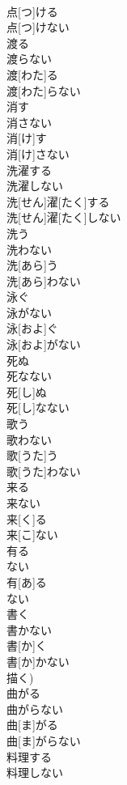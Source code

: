 \documentclass[8pt]{extreport}
\begin{document}
\begin{CJK}{UTF8}{min}
\\	点[つ]ける 
\\	点[つ]けない
\\	渡る 
\\	渡らない	
\\	渡[わた]る 
\\	渡[わた]らない
\\	消す 
\\	消さない	
\\	消[け]す 
\\	消[け]さない
\\	洗濯する 
\\	洗濯しない	
\\	洗[せん]濯[たく]する 
\\	洗[せん]濯[たく]しない
\\	洗う 
\\	洗わない	
\\	洗[あら]う 
\\	洗[あら]わない
\\	泳ぐ 
\\	泳がない	
\\	泳[およ]ぐ 
\\	泳[およ]がない
\\	死ぬ 
\\	死なない	
\\	死[し]ぬ 
\\	死[し]なない
\\	歌う 
\\	歌わない	
\\	歌[うた]う 
\\	歌[うた]わない
\\	来る 
\\	来ない	
\\	来[く]る 
\\	来[こ]ない
\\	有る 
\\	ない	
\\	有[あ]る 
\\	ない
\\	書く 
\\	書かない	
\\	書[か]く 
\\	書[か]かない 
\\	描く)
\\	曲がる 
\\	曲がらない	
\\	曲[ま]がる 
\\	曲[ま]がらない
\\	料理する 
\\	料理しない	

\end{CJK}
\end{document}
